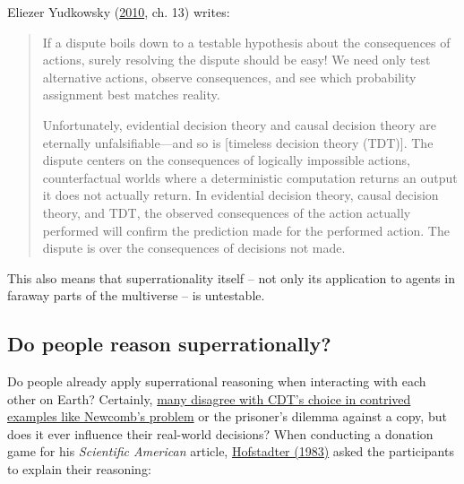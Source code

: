 Eliezer Yudkowsky
(\href{https://intelligence.org/files/TDT.pdf}{2010}, ch. 13)
writes:

\begin{quote}
If a dispute boils down to a testable hypothesis about the consequences
of actions, surely resolving the dispute should be easy! We need only
test alternative actions, observe consequences, and see which
probability assignment best matches reality.

Unfortunately, evidential decision theory and causal decision theory are
eternally unfalsifiable---and so is {[}timeless decision theory
(TDT){]}. The dispute centers on the consequences of logically
impossible actions, counterfactual worlds where a deterministic
computation returns an output it does not actually return. In evidential
decision theory, causal decision theory, and TDT, the observed
consequences of the action actually performed will confirm the
prediction made for the performed action. The dispute is over the
consequences of decisions not made.
\end{quote}

This also means that superrationality itself -- not only its application
to agents in faraway parts of the multiverse -- is untestable.

\hypertarget{do-people-reason-superrationally}{\subsection{Do people
reason superrationally?}\label{do-people-reason-superrationally}}

Do people already apply superrational reasoning when interacting with
each other on Earth? Certainly,
\href{https://casparoesterheld.com/2017/06/27/a-survey-of-polls-on-newcombs-problem/}{many
disagree with CDT's choice in contrived examples like Newcomb's
problem} or the prisoner's dilemma against a copy, but does it ever
influence their real-world decisions? When conducting a donation game
for his \emph{Scientific American} article,
\href{https://www.gwern.net/docs/1985-hofstadter\#dilemmas-for-superrational-thinkers-leading-up-to-a-luring-lottery}{Hofstadter
(1983)} asked the participants to explain their reasoning:

